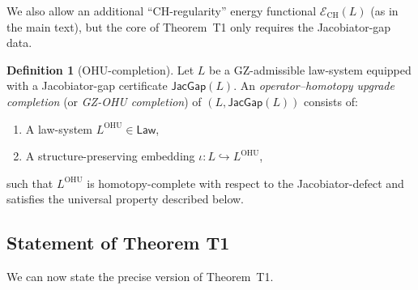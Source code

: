 \documentclass[11pt]{book}
\theoremstyle{plain}
\theoremstyle{definition}
\newtheorem{definition}[theorem]{Definition} \theoremstyle{remark}
\begin{document}
We also allow an additional ``CH-regularity'' energy functional
\(\mathcal{E}_{\mathrm{CH}}(L)\) (as in the main text), but the core of
Theorem~T1 only requires the Jacobiator-gap data.

\begin{definition}[OHU-completion]
Let \(L\) be a GZ-admissible law-system equipped with a
Jacobiator-gap certificate \(\mathsf{JacGap}(L)\).  An
\emph{operator--homotopy upgrade completion} (or \emph{GZ-OHU
completion}) of \((L,\mathsf{JacGap}(L))\) consists of:
\begin{enumerate}
  \item[(i)] A law-system \(L^{\mathrm{OHU}}\in\mathsf{Law}\),
  \item[(ii)] A structure-preserving embedding
    \(\iota : L\hookrightarrow L^{\mathrm{OHU}}\),
\end{enumerate}
such that \(L^{\mathrm{OHU}}\) is homotopy-complete with respect to the
Jacobiator-defect and satisfies the universal property described below.
\end{definition}



\subsection*{Statement of Theorem T1}


We can now state the precise version of Theorem~T1.
\end{document}

